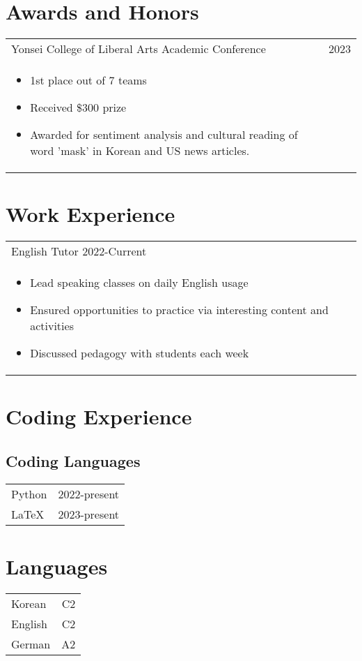 \documentclass[11pt]{article}
\begin{document}
\section{Awards and Honors}
\begin{tabularx}{\textwidth}{X r}
Yonsei College of Liberal Arts Academic Conference & 2023 \\
\begin{minipage}[t]{\linewidth}
	\begin{itemize}[parsep=-6pt]
	\item 1st place out of 7 teams
	\item Received \$300 prize
	\item Awarded for sentiment analysis and cultural reading of word 'mask' in Korean and US news articles.
    \end{itemize}
\end{minipage} & \\
\end{tabularx}
\vspace{0.8cm}

\section{Work Experience} %
\begin{tabularx}{\textwidth}{X r}
English Tutor 2022-Current\\
\begin{minipage}[t]{\linewidth}
	\begin{itemize}[parsep=-6pt]
	\item Lead speaking classes on daily English usage
	\item Ensured opportunities to practice via interesting content and activities
	\item Discussed pedagogy with students each week
    \end{itemize}
\end{minipage} & \\
\end{tabularx}
\vspace{0.8cm}

\section{Coding Experience}
\subsection{Coding Languages}
\begin{tabularx}{\textwidth}{X r}
Python & 2022-present \\
LaTeX & 2023-present \\
\end{tabularx}
\vspace{0.3cm}

\section{Languages}
\begin{tabularx}{\textwidth}{X r}
Korean & C2\\
English & C2 \\
German & A2 \\
\end{tabularx}
\vspace{0.8cm}
\end{document}
